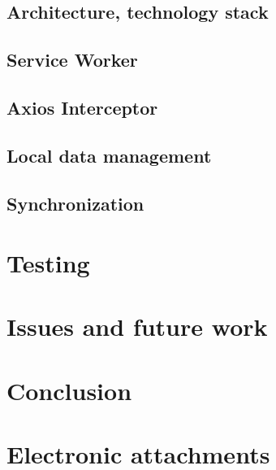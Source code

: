 \documentclass[
  digital,     %
  color,       %
  oneside,     %
  nosansbold,  %
  nocolorbold, %
  lof,         %
  lot,         %
]{fithesis4}
\begin{document}
\section{Architecture, technology stack}
\section{Service Worker}
\section{Axios Interceptor}
\section{Local data management}
\section{Synchronization}

\chapter{Testing}
\chapter{Issues and future work}

\chapter*{Conclusion}

\setcounter{biburllcpenalty}{7000}
\setcounter{biburlucpenalty}{8000}
\printbibliography[heading=bibintoc] %

\appendix %
\chapter{Electronic attachments}
\end{document}
